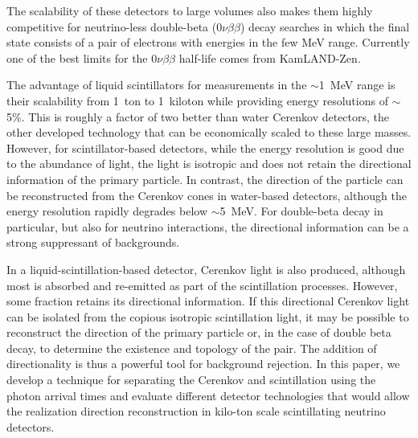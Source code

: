 \documentclass[aps,prc,twocolumn,groupedaddress,showpacs,amsmath,amssymb,floatfix,superscriptaddress]{revtex4}
\begin{document}
The scalability of these detectors to large volumes also makes them
highly competitive for neutrino-less double-beta ($0\nu\beta\beta$)
decay searches in which the final state consists of a pair of
electrons with energies in the few MeV range.  Currently one of the
best limits for the $0\nu\beta\beta$ half-life comes from
KamLAND-Zen\cite{KZ0nu}.

The advantage of liquid scintillators for measurements in the
$\sim$1~MeV range is their scalability from 1~ton to 1~kiloton while
providing energy resolutions of $\sim$5\%. This is roughly a factor of
two better than water Cerenkov detectors, the other developed
technology that can be economically scaled to these large
masses. However, for scintillator-based detectors, while the energy
resolution is good due to the abundance of light, the light is
isotropic and does not retain the directional information of the
primary particle.  In contrast, the direction of the particle can be
reconstructed from the Cerenkov cones in water-based detectors,
although the energy resolution rapidly degrades below $\sim$5~MeV. For
double-beta decay in particular, but also for neutrino interactions,
the directional information can be a strong suppressant of
backgrounds.

In a liquid-scintillation-based detector, Cerenkov light is also
produced, although most is absorbed and re-emitted as part of the
scintillation processes.  However, some fraction retains its
directional information. If this directional Cerenkov light can be
isolated from the copious isotropic scintillation light, it may be
possible to reconstruct the direction of the primary particle or, in
the case of double beta decay, to determine the existence and topology
of the pair.  The addition of directionality is thus a powerful tool
for background rejection.  In this paper, we develop a technique for
separating the Cerenkov and scintillation using the photon arrival
times and evaluate different detector technologies that would allow
the realization direction reconstruction in kilo-ton scale
scintillating neutrino detectors.
\end{document}
